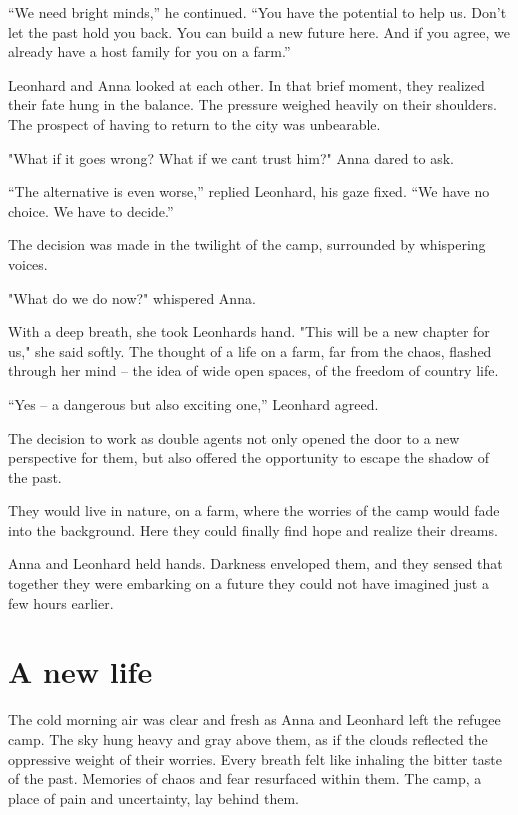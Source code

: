 \documentclass[
]{article}
\begin{document}
``We need bright minds,'' he continued. ``You have the potential to help us. Don't let the past hold you back. You can build a new future here. And if you agree, we already have a host family for you on a farm.''

Leonhard and Anna looked at each other. In that brief moment, they realized their fate hung in the balance. The pressure weighed heavily on their shoulders. The prospect of having to return to the city was unbearable.

"What if it goes wrong? What if we can\textquotesingle t trust him?" Anna dared to ask.

``The alternative is even worse,'' replied Leonhard, his gaze fixed. ``We have no choice. We have to decide.''

The decision was made in the twilight of the camp, surrounded by whispering voices.

"What do we do now?" whispered Anna.

With a deep breath, she took Leonhard\textquotesingle s hand. "This will be a new chapter for us," she said softly. The thought of a life on a farm, far from the chaos, flashed through her mind -- the idea of \hspace{0pt}\hspace{0pt}wide open spaces, of the freedom of country life.

``Yes -- a dangerous but also exciting one,'' Leonhard agreed.

The decision to work as double agents not only opened the door to a new perspective for them, but also offered the opportunity to escape the shadow of the past.

They would live in nature, on a farm, where the worries of the camp would fade into the background. Here they could finally find hope and realize their dreams.

Anna and Leonhard held hands. Darkness enveloped them, and they sensed that together they were embarking on a future they could not have imagined just a few hours earlier.

\section{A new life}\label{a-new-life}

The cold morning air was clear and fresh as Anna and Leonhard left the refugee camp. The sky hung heavy and gray above them, as if the clouds reflected the oppressive weight of their worries. Every breath felt like inhaling the bitter taste of the past. Memories of chaos and fear resurfaced within them. The camp, a place of pain and uncertainty, lay behind them.
\end{document}
